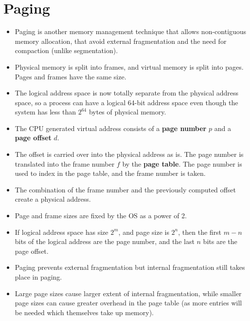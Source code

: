 \documentclass{article}
\theoremstyle{plain}
\theoremstyle{definition}
\begin{document}
\section{Paging}
\begin{itemize}
    \item Paging is another memory management technique that allows non-contiguous memory allocation, that avoid external fragmentation and the need for compaction (unlike segmentation).
    
    \item Physical memory is split into frames, and virtual memory is split into pages. Pages and frames have the same size.
    
    \item The logical address space is now totally separate from the physical address space, so a process can have a logical 64-bit address space even though the system has less than $2^{64}$ bytes of physical memory.
    
    \item The CPU generated virtual address consists of a \textbf{page number} $p$ and a \textbf{page offset} $d$. 
    
    \item The offset is carried over into the physical address as is. The page number is translated into the frame number $f$ by the \textbf{page table}. The page number is used to index in the page table, and the frame number is taken. 
    
    \item The combination of the frame number and the previously computed offset create a physical address. 
    
    \item Page and frame sizes are fixed by the OS as a power of 2. 
    
    \item If logical address space has size $2^m$, and page size is $2^n$, then the first $m-n$ bits of the logical address are the page number, and the last $n$ bits are the page offset. 
    
    \item Paging prevents external fragmentation but internal fragmentation still takes place in paging.
    
    \item Large page sizes cause larger extent of internal fragmentation, while smaller page sizes can cause greater overhead in the page table (as more entries will be needed which themselves take up memory). 
    

\end{itemize}
\end{document}

